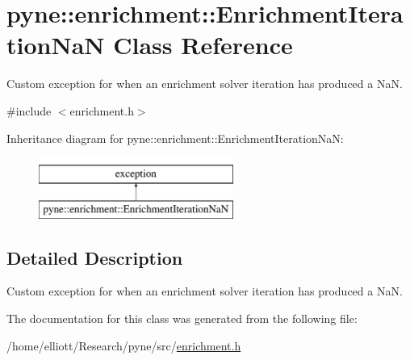 \hypertarget{classpyne_1_1enrichment_1_1_enrichment_iteration_na_n}{\section{pyne\-:\-:enrichment\-:\-:Enrichment\-Iteration\-Na\-N Class Reference}
\label{classpyne_1_1enrichment_1_1_enrichment_iteration_na_n}
}


Custom exception for when an enrichment solver iteration has produced a Na\-N.  




{\ttfamily \#include $<$enrichment.\-h$>$}

Inheritance diagram for pyne\-:\-:enrichment\-:\-:Enrichment\-Iteration\-Na\-N\-:\begin{figure}[H]
\begin{center}
\leavevmode
\includegraphics[height=2.000000cm]{classpyne_1_1enrichment_1_1_enrichment_iteration_na_n}
\end{center}
\end{figure}


\subsection{Detailed Description}
Custom exception for when an enrichment solver iteration has produced a Na\-N. 

The documentation for this class was generated from the following file\-:\begin{DoxyCompactItemize}
\item 
/home/elliott/\-Research/pyne/src/\hyperlink{enrichment_8h}{enrichment.\-h}\end{DoxyCompactItemize}
